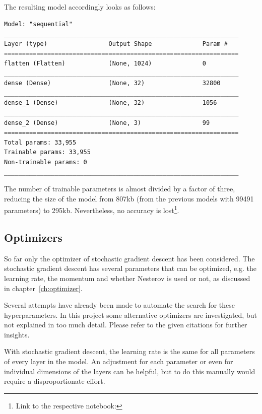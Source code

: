 The resulting model accordingly looks as follows:

\begin{lstlisting}[caption={Summary of improved model.}]
Model: "sequential"
_________________________________________________________________
Layer (type)                 Output Shape              Param #   
=================================================================
flatten (Flatten)            (None, 1024)              0         
_________________________________________________________________
dense (Dense)                (None, 32)                32800     
_________________________________________________________________
dense_1 (Dense)              (None, 32)                1056      
_________________________________________________________________
dense_2 (Dense)              (None, 3)                 99        
=================================================================
Total params: 33,955
Trainable params: 33,955
Non-trainable params: 0
_________________________________________________________________
\end{lstlisting}

The number of trainable parameters is almost divided by a factor of three, reducing the size of the model from 807kb (from the previous models with 99491 parameters) to 295kb.
Nevertheless, no accuracy is lost\footnote{Link to the respective notebook: }.

\subsection{Optimizers}

So far only the optimizer of stochastic gradient descent has been considered.
The stochastic gradient descent has several parameters that can be optimized, e.g. the learning rate, the momentum and whether Nesterov is used or not, as discussed in chapter~\ref{ch:optimizer}.

Several attempts have already been made to automate the search for these hyperparameters.
In this project some alternative optimizers are investigated, but not explained in too much detail.
Please refer to the given citations for further insights.

With stochastic gradient descent, the learning rate is the same for all parameters of every layer in the model.
An adjustment for each parameter or even for individual dimensions of the layers can be helpful, but to do this manually would require a disproportionate effort.

